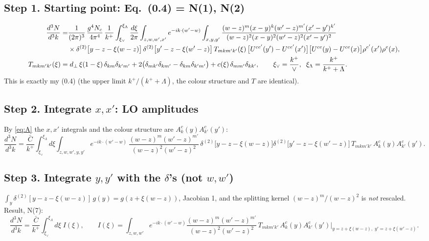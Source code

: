 \documentclass[10pt]{article}
\numberwithin{equation}{section}
\newcommand{\Wop}[2]{\big[U^{ce'}(#2)-U^{ce'}(x')\big]\big[U^{ce}(#1)-U^{ce}(x)\big]\rho^{e'}(x')\rho^{e}(x)}
\newcommand{\Cb}{\bar C}
\newcommand{\red}[1]{{\color{red}#1}}
\begin{document}
\subsection*{Step 1. Starting point: Eq.~(0.4) = N(1), N(2)}
\begin{align}
\frac{d^{3}N}{d^{3}k}= &\frac{1}{(2\pi)^{3}}\,\frac{g^{4}N_{c}}{4\pi^{4}}\,\frac{1}{k^{+}}\int_{\xi_\vee}^{\xi_\Lambda}\frac{d\xi}{2\pi}
\int_{z,w,w',x'}e^{-ik\cdot(w'-w)}\int_{x,y,y'}\frac{(w-z)^{m}(x-y)^{k}(w'-z)^{m'}(x'-y')^{k'}}{(w-z)^{2}(x-y)^{2}(w'-z)^{2}(x'-y')^{2}}\notag\\
&\times\delta^{(2)}\big[y-z-\xi(w-z)\big]\,\delta^{(2)}\big[y'-z-\xi(w'-z)\big]\,T_{mkm'k'}(\xi)\,\Wop{y}{y'},\label{s1}\\
T_{mkm'k'}(\xi)=&\;d_{\perp}\,\xi(1-\xi)\,\delta_{km}\delta_{k'm'}+2\big(\delta_{mk'}\delta_{km'}-\delta_{km}\delta_{k'm'}\big)+c(\xi)\,\delta_{mm'}\delta_{kk'},\qquad
\xi_\vee=\frac{k^+}{\vee},\;\;\xi_\Lambda=\frac{k^+}{k^++\Lambda}.\notag
\end{align}
This is exactly my (0.4) (the upper limit $k^+/(k^++\Lambda)$, the colour structure and $T$ are identical).

\subsection*{Step 2. Integrate $x,x'$: LO amplitudes}
By \eqref{eq:A} the $x,x'$ integrals and the colour structure are $A^c_k(y)A^c_{k'}(y')$:
\begin{equation}
\frac{d^{3}N}{d^{3}k}=\frac{\Cb}{k^+}\int_{\xi_\vee}^{\xi_\Lambda}d\xi\int_{z,w,w',y,y'}e^{-ik\cdot(w'-w)}\,
\frac{(w-z)^{m}(w'-z)^{m'}}{(w-z)^{2}(w'-z)^{2}}\,\delta^{(2)}\big[y-z-\xi(w-z)\big]\delta^{(2)}\big[y'-z-\xi(w'-z)\big]\,T_{mkm'k'}\,A^c_k(y)A^c_{k'}(y').
\end{equation}

\subsection*{Step 3. Integrate $y,y'$ with the $\delta$'s (\red{not} $w,w'$)}
$\int_y\delta^{(2)}[y-z-\xi(w-z)]\,g(y)=g(z+\xi(w-z))$, Jacobian 1, and the splitting kernel $(w-z)^m/(w-z)^2$ is
\emph{not} rescaled. Result, N(7):
\begin{equation}
\frac{d^{3}N}{d^{3}k}=\frac{\Cb}{k^+}\int_{\xi_\vee}^{\xi_\Lambda}d\xi\;I(\xi),\qquad
I(\xi)=\int_{z,w,w'}e^{-ik\cdot(w'-w)}\frac{(w-z)^{m}(w'-z)^{m'}}{(w-z)^{2}(w'-z)^{2}}\,T_{mkm'k'}\,
A^c_k(y)A^c_{k'}(y')\Big|_{y=z+\xi(w-z),\;y'=z+\xi(w'-z)}.
\end{equation}
\end{document}
